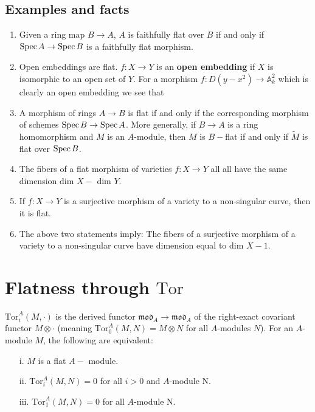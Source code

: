 \documentclass[12pt]{article}
\theoremstyle{mytheoremstyle}
\newcommand{\bA}{\mathbb{A}}
\newcommand{\spec}{\text{Spec\hspace*{.5mm}}}
\newcommand{\tor}{\text{Tor}}
\begin{document}
\subsection*{Examples and facts}
\begin{enumerate}
    \item Given a ring map $B\to A$, $A$ is faithfully flat over $B$
          if and only if $\spec A\to\spec B$ is a faithfully flat morphism.
    \item Open embeddings are flat. $f\colon X\to Y$ is an \textbf{open
              embedding} if $X$ is isomorphic to an open set of $Y$. For a
          morphism $f\colon D(y-x^2)\to \bA^2_k$ which is clearly an open
          embedding we see that
    \item A morphism of rings $A\to B$ is flat if and only if the
          corresponding morphism of schemes $\spec B\to\spec A$.
          More generally, if $B\to A$ is a ring homomorphism and $M$ is
          an $A$-module, then $M$ is $B-$flat if and only if
          $\widetilde{M}$ is flat over $\spec B$.
    \item The fibers of a flat morphism of varieties $f\colon X\to Y$ all
          all have the same dimension dim $X-$ dim $Y$.
    \item If $f\colon X\to Y$ is a surjective morphism of a variety to
          a non-singular curve, then it is flat.
    \item The above two statements imply: The fibers of a surjective
          morphism of a variety to a non-singular curve have dimension
          equal to dim $X-1$.
\end{enumerate}

\section{Flatness through $\tor$}
\hspace*{8mm}$\tor^A_i(M,\cdot)$ is the derived functor
$\mathfrak{mod}_A\to\mathfrak{mod}_A$
of the right-exact covariant functor
$M\otimes\cdot$ (meaning $\tor^A_0(M,N)
    =M\otimes N$ for all $A$-modules $N$).
For an $A$-module $M$, the following are equivalent:
\begin{enumerate}
    \item[i.] $M$ is a flat $A-$ module.
    \item[ii.] $\tor^A_i(M,N)=0$ for all $i>0$ and $A$-module N.
    \item[iii.] $\tor^A_1(M,N)=0$ for all $A$-module N.
\end{enumerate}
\end{document}

